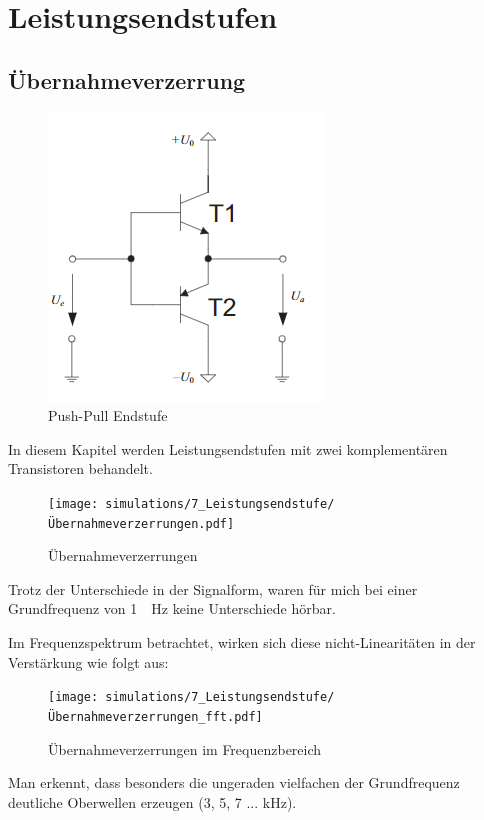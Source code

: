 \chapter{Leistungsendstufen}
\section{Übernahmeverzerrung}

\begin{figure}[H]
    \centering
    \includegraphics{tex/7_Leistungsverstaerker/pictures/Schematic_Emitterfolger.png}
    \caption{Push-Pull Endstufe}
    \label{fig:my_label}
\end{figure}

In diesem Kapitel werden Leistungsendstufen mit zwei komplementären Transistoren behandelt.

\begin{figure}[H]
    \centering
    \texttt{[image: simulations/7\_Leistungsendstufe/Übernahmeverzerrungen.pdf]}
    \caption{Übernahmeverzerrungen}
    \label{fig:my_label}
\end{figure}

Trotz der Unterschiede in der Signalform, waren für mich bei einer Grundfrequenz von \SI{1}{\hilo \hertz} keine Unterschiede hörbar.

Im Frequenzspektrum betrachtet, wirken sich diese nicht-Linearitäten  in der Verstärkung wie folgt aus:

\begin{figure}[H]
    \centering
    \texttt{[image: simulations/7\_Leistungsendstufe/Übernahmeverzerrungen\_fft.pdf]}
    \caption{Übernahmeverzerrungen im Frequenzbereich}
\end{figure}

Man erkennt, dass besonders die ungeraden vielfachen der Grundfrequenz deutliche Oberwellen erzeugen (3, 5, 7 ... kHz).

